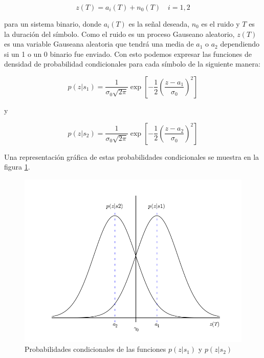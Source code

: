 \begin{equation}\label{eq:demgauss}
z(T)=a_i(T)+n_0(T) \quad i=1,2
\end{equation}

para un sistema binario, donde $a_i(T)$ es la se\~nal deseada, $n_0$ es el ruido y $T$ es la duraci\'on del s\'imbolo. Como
el ruido es un proceso Gauseano aleatorio, $z(T)$ es una variable Gauseana aleatoria que tendr\'a una media de
$a_1$ o $a_2$ dependiendo si un 1 o un 0 binario fue enviado. Con esto podemos expresar las
funciones de densidad de probabilidad condicionales para cada s\'imbolo de la siguiente manera:

\begin{equation}
p(z|s_1)=\frac{1}{\sigma_0
\sqrt{2\pi}}\exp{\left[-\frac{1}{2}\left(\frac{z-a_1}{\sigma_0}\right)^2 \right]}
\end{equation}

y

\begin{equation}
p(z|s_2)=\frac{1}{\sigma_0
\sqrt{2\pi}}\exp{\left[-\frac{1}{2}\left(\frac{z-a_2}{\sigma_0}\right)^2 \right]}
\end{equation}

Una representaci\'on gr\'afica de estas probabilidades condicionales se muestra en la figura
\ref{fig:condpdf}.

\begin{figure}[htp]
\centering
	\includegraphics[width=5.5in]{figs/condpdf}
	\caption{Probabilidades condicionales de las funciones $p(z|s_1)$ y $p(z|s_2)$}
	\label{fig:condpdf}
\end{figure}

